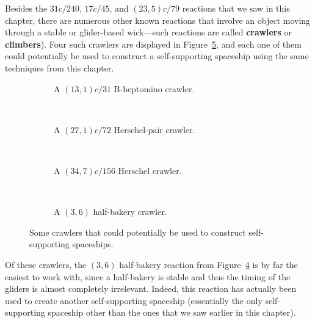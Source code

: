 Besides the $31c/240$, $17c/45$, and $(23,5)c/79$ reactions that we saw in this chapter, there are numerous other known reactions that involve an object moving through a stable or glider-based wick---such reactions are called \textbf{crawlers} or \textbf{climbers}). Four such crawlers are displayed in Figure~\ref{fig:self_support_climbers}, and each one of them could potentially be used to construct a self-supporting spaceship using the same techniques from this chapter.

\begin{figure}[!htb]
	\centering
	\begin{subfigure}{0.495\textwidth}
		\centering
		\caption{A $(13,1)c/31$ B-heptomino crawler.}\label{fig:13_1c_31_b_heptomino_climber}
	\end{subfigure} \ \ \ \begin{subfigure}{0.475\textwidth}
	 	\centering
	 	\caption{A $(27,1)c/72$ Herschel-pair crawler.}\label{fig:27_1c_72_herschel_climber}
	\end{subfigure} \\[0.2cm]
	\begin{subfigure}{0.495\textwidth}
		\centering
		\caption{A $(34,7)c/156$ Herschel crawler.}\label{fig:34_7c_156_herschel_climber}
	\end{subfigure} \ \ \ \begin{subfigure}{0.475\textwidth}
		\centering
		\caption{A $(3,6)$ half-bakery crawler.}\label{fig:half_bakery_reaction}
	\end{subfigure}
	\caption{Some crawlers that could potentially be used to construct self-supporting spaceships.}\label{fig:self_support_climbers}
\end{figure}

Of these crawlers, the $(3,6)$ half-bakery reaction from Figure~\ref{fig:half_bakery_reaction} is by far the easiest to work with, since a half-bakery is stable and thus the timing of the gliders is almost completely irrelevant. Indeed, this reaction has actually been used to create another self-supporting spaceship (essentially the only self-supporting spaceship other than the ones that we saw earlier in this chapter).

